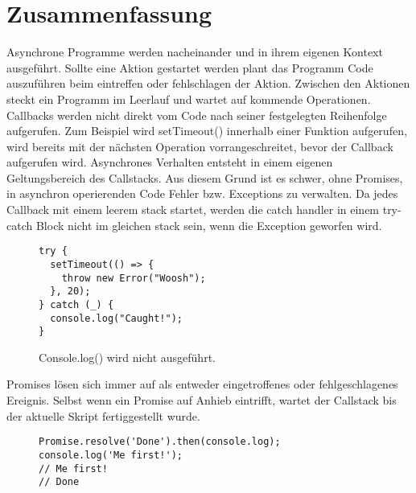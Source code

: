 \section{Zusammenfassung}
Asynchrone Programme werden nacheinander und in ihrem eigenen Kontext ausgeführt. Sollte eine Aktion gestartet werden plant das Programm Code auszuführen beim eintreffen oder fehlschlagen der Aktion. Zwischen den Aktionen steckt ein Programm im Leerlauf und wartet auf kommende Operationen.\\

\noindent
Callbacks werden nicht direkt vom Code nach seiner festgelegten Reihenfolge aufgerufen. Zum Beispiel wird setTimeout() innerhalb einer Funktion aufgerufen, wird bereits mit der nächsten Operation vorrangeschreitet, bevor der Callback aufgerufen wird. Asynchrones Verhalten entsteht in einem eigenen Geltungsbereich des Callstacks. Aus diesem Grund ist es schwer, ohne Promises, in asynchron operierenden Code Fehler bzw. Exceptions zu verwalten. Da jedes Callback mit einem leerem stack startet, werden die catch handler in einem try-catch Block nicht im gleichen stack sein, wenn die Exception geworfen wird.

\begin{figure}[H]
\begin{lstlisting}[basicstyle=\small]
try {
  setTimeout(() => {
    throw new Error("Woosh");
  }, 20);
} catch (_) {
  console.log("Caught!");
}
\end{lstlisting}
\caption{Console.log() wird nicht ausgeführt.}
\end{figure}

\noindent
Promises lösen sich immer auf als entweder eingetroffenes oder fehlgeschlagenes Ereignis. Selbst wenn ein Promise auf Anhieb eintrifft, wartet der Callstack bis der aktuelle Skript fertiggestellt wurde.

\begin{figure}[H]
\begin{lstlisting}[basicstyle=\small]
Promise.resolve('Done').then(console.log);
console.log('Me first!');
// Me first!
// Done
\end{lstlisting}
\end{figure}

